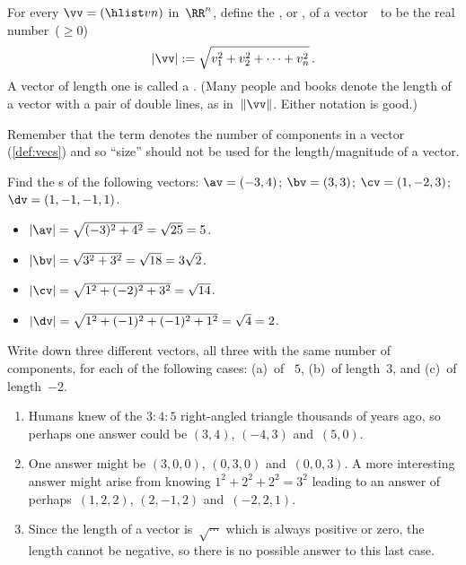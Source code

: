 \begin{definition}[Pythagoras] \label{def:veclen}
For every  \(\vv=(\hlist vn)\) in~\(\RR^n\),
define the , or , of a vector~\vv\  to be the real number~(\(\geq0\))
\begin{equation*}
|\vv|:=\sqrt{v_1^2+v_2^2+\cdots+v_n^2}\,.
\end{equation*}
A vector of length one is called a .
(Many people and books denote the length of a vector with a pair of double lines, as in~\(\|\vv\|\).  Either notation is good.)
\end{definition}

Remember that the term  denotes the number of components in a vector (\cref{def:vecs}) and so ``size'' should not be used for the length\slash magnitude of a vector.


\begin{example} 
Find the s of the following vectors:
\(\av=(-3,4)\); \(\bv=(3,3)\); \(\cv=(1,-2,3)\); \(\dv=(1,-1,-1,1)\).
\begin{solution} 
\begin{itemize}
\item \(|\av|=\sqrt{(-3)^2+4^2}=\sqrt{25}=5\). 
\item \(|\bv|=\sqrt{3^2+3^2}=\sqrt{18}=3\sqrt2\). 
\item \(|\cv|=\sqrt{1^2+(-2)^2+3^2}=\sqrt{14}\). 
\item \(|\dv|=\sqrt{1^2+(-1)^2+(-1)^2+1^2}=\sqrt4=2\).
\aqed
\end{itemize}
\end{solution}
\end{example}

\begin{example} 
Write down three different vectors, all three with the same number of components, for each of the following cases: (a)~of ~\(5\), (b)~of length~\(3\), and (c)~of length~\(-2\).
\begin{solution} 
\begin{enumerate}
\item Humans knew of the \(3:4:5\) right-angled triangle thousands of years ago, so perhaps one answer could be \((3,4)\), \((-4,3)\) and~\((5,0)\).
\item One answer might be \((3,0,0)\), \((0,3,0)\) and~\((0,0,3)\). 
A more interesting answer might arise from knowing \(1^2+2^2+2^2=3^2\) leading to an answer of perhaps~\((1,2,2)\), \((2,-1,2)\) and~\((-2,2,1)\).
\item Since the length of a vector is~\(\sqrt{\cdots}\) which is always positive or zero, the length cannot be negative, so there is no possible answer to this last case.
\aqed
\end{enumerate}
\end{solution}
\end{example}




